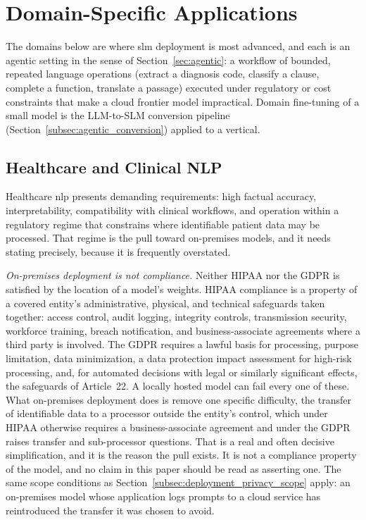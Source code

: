 
\section{Domain-Specific Applications}
\label{sec:applications}

The domains below are where \gls{slm} deployment is most advanced, and each is an
agentic setting in the sense of Section~\ref{sec:agentic}: a workflow of bounded,
repeated language operations (extract a diagnosis code, classify a clause,
complete a function, translate a passage) executed under regulatory or cost
constraints that make a cloud frontier model impractical. Domain fine-tuning of a
small model is the LLM-to-SLM conversion pipeline
(Section~\ref{subsec:agentic_conversion}) applied to a vertical.

\subsection{Healthcare and Clinical NLP}
\label{subsec:applications_healthcare}

Healthcare \gls{nlp} presents demanding requirements: high factual accuracy, interpretability, compatibility with clinical workflows, and operation within a regulatory regime that constrains where identifiable patient data may be processed. That regime is the pull toward on-premises models, and it needs stating precisely, because it is frequently overstated.

\emph{On-premises deployment is not compliance.} Neither HIPAA nor the GDPR is
satisfied by the location of a model's weights. HIPAA compliance is a property of
a covered entity's administrative, physical, and technical safeguards taken
together: access control, audit logging, integrity controls, transmission
security, workforce training, breach notification, and business-associate
agreements where a third party is involved. The GDPR requires a lawful basis for
processing, purpose limitation, data minimization, a data protection impact
assessment for high-risk processing, and, for automated decisions with legal or
similarly significant effects, the safeguards of Article~22. A locally hosted
model can fail every one of these. What on-premises deployment does is remove one
specific difficulty, the transfer of identifiable data to a processor outside the
entity's control, which under HIPAA otherwise requires a business-associate
agreement and under the GDPR raises transfer and sub-processor questions. That is
a real and often decisive simplification, and it is the reason the pull exists.
It is not a compliance property of the model, and no claim in this paper should
be read as asserting one. The same scope conditions as
Section~\ref{subsec:deployment_privacy_scope} apply: an on-premises model whose
application logs prompts to a cloud service has reintroduced the transfer it was
chosen to avoid.


